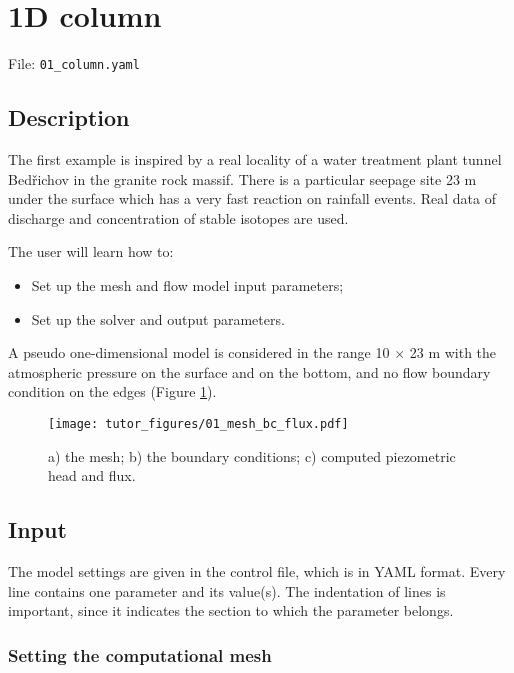 \section{1D column}

File: \texttt{01\_column.yaml}

\subsection{Description}

The first example is inspired by a real locality of a water treatment
plant tunnel Bedřichov in the granite rock massif. There is a particular
seepage site 23 m under the surface which has a very fast reaction on
rainfall events. Real data of discharge and concentration of stable
isotopes are used.

The user will learn how to:

\begin{itemize}
\tightlist
\item
  Set up the mesh and flow model input parameters;
\item
  Set up the solver and output parameters.
\end{itemize}

A pseudo one-dimensional model is considered in the range 10 \(\times\)
23 m with the atmospheric pressure on the surface and on the bottom, and
no flow boundary condition on the edges (Figure \ref{fig:column_geom}).

\begin{figure}[htbp]
\centering
\texttt{[image: tutor\_figures/01\_mesh\_bc\_flux.pdf]}
\caption{a) the mesh; b) the boundary conditions; c) computed
piezometric head and flux.\label{fig:column_geom}}
\end{figure}

\subsection{Input}

The model settings are given in the control file, which is in YAML
format. Every line contains one parameter and its value(s). The
indentation of lines is important, since it indicates the section to
which the parameter belongs.

\subsubsection{Setting the computational mesh}

